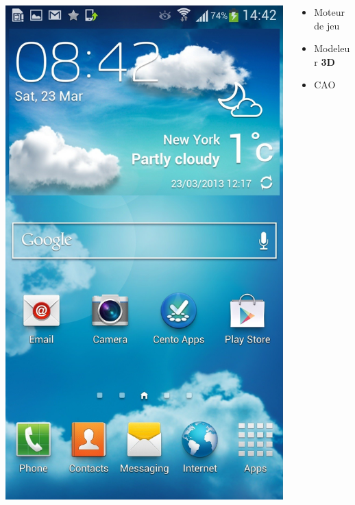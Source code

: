 \begin{frame}
\begin{columns}
\begin{column}[t]{.1\textwidth}
\begin{center}
        \includegraphics[width=1.\textwidth]{images/touchwiz.jpg}
      \end{center}
    \end{column}
    \begin{column}{.4\textwidth}
      \begin{itemize}
      \item Moteur de jeu %
      \item Modeleur \textbf{3D}
      \item CAO

\end{itemize}
\end{column}
\end{columns}
\end{frame}
